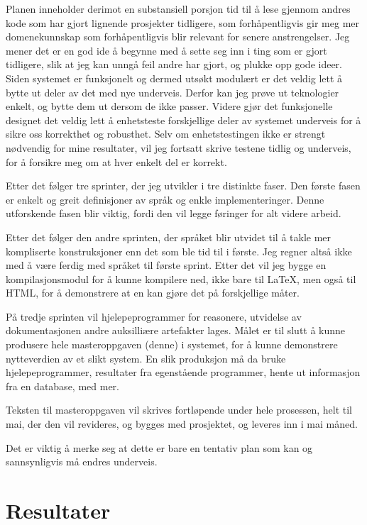 \documentclass[11pt]{article}
\begin{document}
Planen inneholder derimot en substansiell porsjon tid til å lese gjennom andres kode som har gjort lignende prosjekter tidligere, som forhåpentligvis gir meg mer domenekunnskap som forhåpentligvis blir relevant for senere anstrengelser.
Jeg mener det er en god ide å begynne med å sette seg inn i ting som er gjort tidligere, slik at jeg kan unngå feil andre har gjort, og plukke opp gode ideer.
Siden systemet er funksjonelt og dermed utsøkt modulært er det veldig lett å bytte ut deler av det med nye underveis. Derfor kan jeg prøve ut teknologier enkelt, og bytte dem ut dersom de ikke passer.
Videre gjør det funksjonelle designet det veldig lett å enhetsteste forskjellige deler av systemet underveis for å sikre oss korrekthet og robusthet.
Selv om enhetstestingen ikke er strengt nødvendig for mine resultater, vil jeg fortsatt skrive testene tidlig og underveis, for å forsikre meg om at hver enkelt del er korrekt.

Etter det følger tre sprinter, der jeg utvikler i tre distinkte faser.
Den første fasen er enkelt og greit definisjoner av språk og enkle implementeringer. Denne utforskende fasen blir viktig, fordi den vil legge føringer for alt videre arbeid.

Etter det følger den andre sprinten, der språket blir utvidet til å takle mer kompliserte konstruksjoner enn det som ble tid til i første.
Jeg regner altså ikke med å være ferdig med språket til første sprint. Etter det vil jeg bygge en kompilasjonsmodul for å kunne kompilere ned, ikke bare til \LaTeX, men også til HTML, for å demonstrere at en kan gjøre det på forskjellige måter.

På tredje sprinten vil hjelepeprogrammer for reasonere, utvidelse av dokumentasjonen andre auksilliære artefakter lages. Målet er til slutt å kunne produsere hele masteroppgaven (denne) i systemet, for å kunne demonstrere nytteverdien av et slikt system.
En slik produksjon må da bruke hjelepeprogrammer, resultater fra egenstående programmer, hente ut informasjon fra en database, med mer.

Teksten til masteroppgaven vil skrives fortløpende under hele prosessen, helt til mai, der den vil revideres, og bygges med prosjektet, og leveres inn i mai måned.

Det er viktig å merke seg at dette er bare en tentativ plan som kan og sannsynligvis må endres underveis.


\section{Resultater}
\label{sec:resultater}
\end{document}
